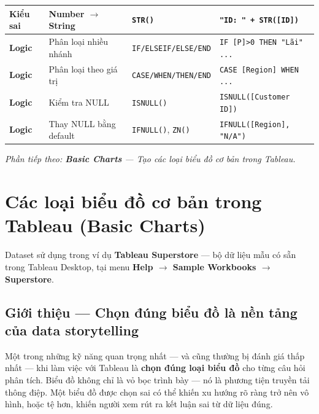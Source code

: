 \documentclass[12pt]{article}
\begin{document}
\begin{center}
\begin{tabularx}{\linewidth}{l X l X}
\textbf{Kiểu sai} & Number $\rightarrow$ String & \texttt{STR()} & \texttt{"ID: " + STR([ID])} \\
\midrule
\textbf{Logic} & Phân loại nhiều nhánh & \texttt{IF/ELSEIF/ELSE/END} & \texttt{IF [P]>0 THEN "Lãi" ...} \\
\textbf{Logic} & Phân loại theo giá trị & \texttt{CASE/WHEN/THEN/END} & \texttt{CASE [Region] WHEN ...} \\
\textbf{Logic} & Kiểm tra NULL & \texttt{ISNULL()} & \texttt{ISNULL([Customer ID])} \\
\textbf{Logic} & Thay NULL bằng default & \texttt{IFNULL()}, \texttt{ZN()} & \texttt{IFNULL([Region], "N/A")} \\
\bottomrule
\end{tabularx}
\end{center}

\vspace{1em}
\noindent \textit{Phần tiếp theo: \textbf{Basic Charts} --- Tạo các loại biểu đồ cơ bản trong Tableau.}



\newpage
\section{Các loại biểu đồ cơ bản trong Tableau (Basic Charts)}
\label{section:basic-charts}




\begin{conceptbox}{Dataset sử dụng trong ví dụ}
\textbf{Tableau Superstore} --- bộ dữ liệu mẫu có sẵn trong Tableau Desktop, tại menu \textbf{Help $\rightarrow$ Sample Workbooks $\rightarrow$ Superstore}.
\end{conceptbox}


\subsection{Giới thiệu --- Chọn đúng biểu đồ là nền tảng của data storytelling}

\noindent Một trong những kỹ năng quan trọng nhất --- và cũng thường bị đánh giá thấp nhất --- khi làm việc với Tableau là \textbf{chọn đúng loại biểu đồ} cho từng câu hỏi phân tích. Biểu đồ không chỉ là vỏ bọc trình bày --- nó là phương tiện truyền tải thông điệp. Một biểu đồ được chọn sai có thể khiến xu hướng rõ ràng trở nên vô hình, hoặc tệ hơn, khiến người xem rút ra kết luận sai từ dữ liệu đúng.
\end{document}

